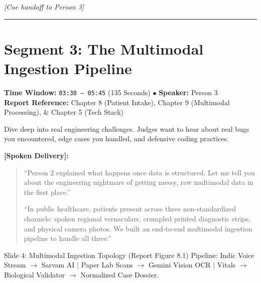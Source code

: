 \documentclass[11pt,a4paper]{article}
\begin{document}
\noindent \textit{[Cue handoff to Person 3]}

\vspace{4mm}
\hrule
\vspace{6mm}

\section{Segment 3: The Multimodal Ingestion Pipeline}
\noindent \textbf{Time Window:} \texttt{03:30 -- 05:45} (135 Seconds) \quad $\bullet$ \quad \textbf{Speaker:} Person 3\\
\textbf{Report Reference:} Chapter 8 (Patient Intake), Chapter 9 (Multimodal Processing), \& Chapter 5 (Tech Stack)

\begin{stagenote}
Dive deep into real engineering challenges. Judges want to hear about real bugs you encountered, edge cases you handled, and defensive coding practices.
\end{stagenote}

\vspace{1mm}
\noindent \textbf{[Spoken Delivery]:}
\begin{quote}
``Person 2 explained what happens once data is structured. Let me tell you about the engineering nightmare of getting messy, raw multimodal data in the first place.''

``In public healthcare, patients present across three non-standardized channels: spoken regional vernaculars, crumpled printed diagnostic strips, and physical camera photos. We built an end-to-end multimodal ingestion pipeline to handle all three.''
\end{quote}

\begin{slidebox}{Slide 4: Multimodal Ingestion Topology (Report Figure 8.1)}
Pipeline: Indic Voice Stream $\to$ Sarvam AI $\vert$ Paper Lab Scans $\to$ Gemini Vision OCR $\vert$ Vitals $\to$ Biological Validator $\to$ Normalized Case Dossier.
\end{slidebox}
\end{document}
